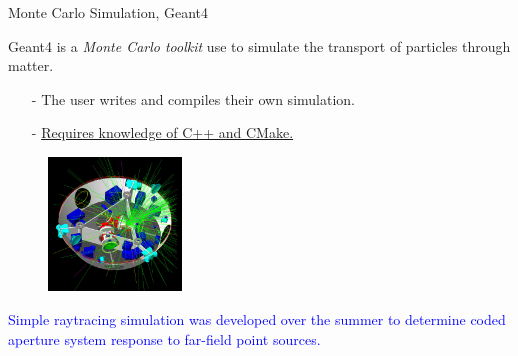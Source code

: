 \documentclass[xcolor=x11names,compress]{beamer}
\renewcommand{\(}{\begin{columns}}
\renewcommand{\)}{\end{columns}}
\newcommand{\<}[1]{\begin{column}{#1}}
\renewcommand{\>}{\end{column}}
\begin{document}
\begin{frame}{Monte Carlo Simulation, Geant4}

Geant4 \cite{Agostinelli} is a \emph{Monte Carlo toolkit} use to simulate the transport of particles through matter.
\begin{itemize}
\small
\item[-] The user writes and compiles their own simulation. %
\item[-] \underline{Requires knowledge of C++ and CMake.}
\end{itemize}

\begin{figure}
\includegraphics[height=1.4in]{Figures/LISAGeant4.jpg}
\end{figure}

\textcolor{blue}{Simple raytracing simulation was developed over the summer to determine coded aperture system response to far-field point sources.}

\end{frame}
\end{document}
